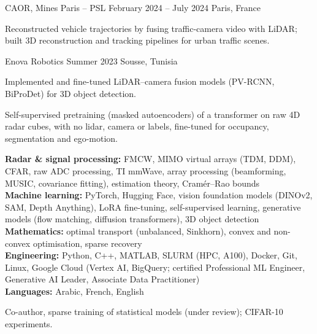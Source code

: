 %
        {CAOR, Mines Paris -- PSL}%
        {February 2024 -- July 2024}%
        {Paris, France}
\begin{cvitems}
  \item Reconstructed vehicle trajectories by fusing traffic-camera video with LiDAR; built
        3D reconstruction and tracking pipelines for urban traffic scenes.
\end{cvitems}

%
        {Enova Robotics}%
        {Summer 2023}%
        {Sousse, Tunisia}
\begin{cvitems}
  \item Implemented and fine-tuned LiDAR--camera fusion models (PV-RCNN, BiProDet) for 3D object detection.
\end{cvitems}


%
  {Self-supervised pretraining (masked autoencoders) of a transformer on raw 4D radar cubes,
   with no lidar, camera or labels, fine-tuned for occupancy, segmentation and ego-motion.}


\noindent
\textbf{Radar \& signal processing:} FMCW, MIMO virtual arrays (TDM, DDM), CFAR, raw ADC
  processing, TI mmWave, array processing (beamforming, MUSIC, covariance fitting), estimation
  theory, Cramér--Rao bounds\\
\textbf{Machine learning:} PyTorch, Hugging Face, vision foundation models (DINOv2, SAM, Depth
  Anything), LoRA fine-tuning, self-supervised learning, generative models (flow matching,
  diffusion transformers), 3D object detection\\
\textbf{Mathematics:} optimal transport (unbalanced, Sinkhorn), convex and non-convex
  optimisation, sparse recovery\\
\textbf{Engineering:} Python, C++, MATLAB, SLURM (HPC, A100), Docker, Git, Linux, Google Cloud
  (Vertex AI, BigQuery; certified Professional ML Engineer, Generative AI Leader, Associate
  Data Practitioner)\\
\textbf{Languages:} Arabic, French, English

\PublicationsBlock
{}%
      {}%
      {Co-author, sparse training of statistical models (under review); CIFAR-10 experiments.}
\EducationBlock


